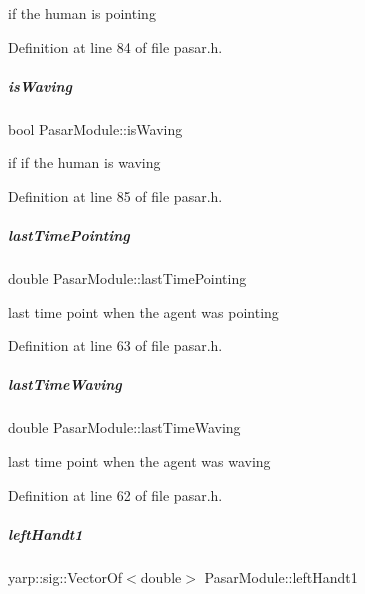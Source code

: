 if the human is pointing 



Definition at line 84 of file pasar.\+h.

\mbox{\label{group__pasar_af357a34636a7af813bd7cd980f3cafb2}} 
\subparagraph{\texorpdfstring{is\+Waving}{isWaving}}
{\footnotesize\ttfamily bool Pasar\+Module\+::is\+Waving\hspace{0.3cm}{\ttfamily [protected]}}



if if the human is waving 



Definition at line 85 of file pasar.\+h.

\mbox{\label{group__pasar_a0b488dc62d174ea71ec6edbea36e746f}} 
\subparagraph{\texorpdfstring{last\+Time\+Pointing}{lastTimePointing}}
{\footnotesize\ttfamily double Pasar\+Module\+::last\+Time\+Pointing\hspace{0.3cm}{\ttfamily [protected]}}



last time point when the agent was pointing 



Definition at line 63 of file pasar.\+h.

\mbox{\label{group__pasar_a679e9095d786c28375abe7f87420783b}} 
\subparagraph{\texorpdfstring{last\+Time\+Waving}{lastTimeWaving}}
{\footnotesize\ttfamily double Pasar\+Module\+::last\+Time\+Waving\hspace{0.3cm}{\ttfamily [protected]}}



last time point when the agent was waving 



Definition at line 62 of file pasar.\+h.

\mbox{\label{group__pasar_a9bd22f6f18bdb9d5acb8b8fb8858716f}} 
\subparagraph{\texorpdfstring{left\+Handt1}{leftHandt1}}
{\footnotesize\ttfamily yarp\+::sig\+::\+Vector\+Of$<$double$>$ Pasar\+Module\+::left\+Handt1\hspace{0.3cm}{\ttfamily [protected]}}



